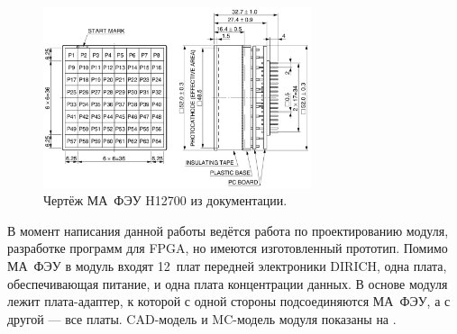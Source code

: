 \begin{figure}[H]
\centering
\includegraphics[width=0.7\textwidth]{pictures/H12700_drawing.png}
\caption{Чертёж МА~ФЭУ H12700 из документации.}
\label{fig:H12700drawing}
\end{figure}

В момент написания данной работы ведётся работа по проектированию модуля, разработке программ для FPGA, но имеются изготовленный прототип. Помимо МА~ФЭУ в модуль входят 12~плат передней электроники DIRICH, одна плата, обеспечивающая питание, и одна плата концентрации данных. В основе модуля лежит плата-адаптер, к которой с одной стороны подсоединяются МА~ФЭУ, а с другой --- все платы. CAD-модель и MC-модель модуля показаны на .

